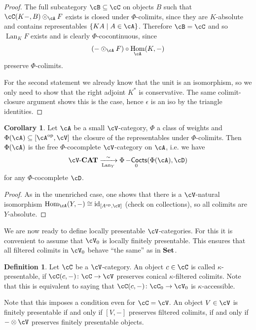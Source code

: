 \documentclass[a4paper,11pt,oneside,openany]{scrbook}
\newcommand{\catname}[1]{{\normalfont\textbf{#1}}}
\newcommand{\Set}{\catname{Set}}
\newcommand{\CAT}{\catname{CAT}}
\newcommand{\from}{\colon}
\newcommand{\iso}{\cong}
\DeclareMathOperator{\Hom}{\text{Hom}}
\DeclareMathOperator{\op}{\text{op}}
\DeclareMathOperator{\Cocts}{-\mathsf{Cocts}}
\DeclareMathOperator{\id}{id}
\DeclareMathOperator{\Lan}{Lan}
\theoremstyle{definition}
\theoremstyle{definition}
\newtheorem{defn}[thm]{Definition} %
\newtheorem{cor}[thm]{Corollary}
\begin{document}
\begin{proof}
    The full subcategory $ \cB \subseteq \cC $ on objects $ B $ such that $ \cC(K-,B)\odot _\cA F $ exists is closed under $ \Phi $-colimits, since they are $ K $-absolute and contains representables $ \{ KA \mid A \in \cA \} $.
    Therefore $ \cB = \cC $ and so $ \Lan_K F $ exists and is clearly $ \Phi $-cocontinuous, since
    \begin{displaymath}
	(- \odot _\cA F) \circ \Hom_\cA (K,-)
    \end{displaymath}
    preserve $ \Phi $-colimits.

    For the second statement we already know that the unit is an isomorphism, so we only need to show that the right adjoint $ K^* $ is conservative.
    The same colimit-closure argument shows this is the case, hence $ \epsilon $ is an iso by the triangle identities.
\end{proof}
\begin{cor}
    Let $ \cA $ be a small $ \cV $-category, $ \Phi $ a class of weights and $ \Phi(\cA) \subseteq [\cA^{\op},\cV] $ the closure of the representables under $ \Phi $-colimits.
    Then $ \Phi(\cA) $ is the free $ \Phi $-cocomplete $ \cV $-category on $ \cA $, i.e. we have 
    \begin{displaymath}
	\cV\text{-}\CAT \xrightarrow[\Lan_Y]{\sim} \Phi\Cocts_0(\Phi(\cA),\cD)
    \end{displaymath}
    for any $ \Phi $-cocomplete $ \cD $.
\end{cor}
\begin{proof}
    As in the unenriched case, one shows that there is a $ \cV $-natural isomorphism $ \Hom_\cA(Y,-)\iso \id_{[A^{\op}, \cV]} $ (check on collections),
    so all colimits are $ Y $-absolute.
\end{proof}
We are now ready to define locally presentable $ \cV $-categories.
For this it is convenient to assume that $ \cV_0 $ is locally finitely presentable.
This ensures that all filtered colimits in $ \cV_0 $ behave ``the same'' as in $ \Set $.

\begin{defn}
    Let $ \cC $ be a $ \cV $-category.
    An object $ c \in \cC $ is called $ \kappa $-presentable, if $ \cC(c,-) \from \cC \to \cV $ preserves conical $ \kappa $-filtered colimits.
    Note that this is equivalent to saying that $ \cC (c,-)\from \cC_0 \to \cV_0 $ is $ \kappa $-accessible.
\end{defn}

Note that this imposes a condition even for $ \cC = \cV $.
An object $ V \in \cV $ is finitely presentable if and only if $ [V,-] $ preserves filtered colimits, if and only if $ -\otimes \cV $ preserves finitely presentable objects.
\end{document}
